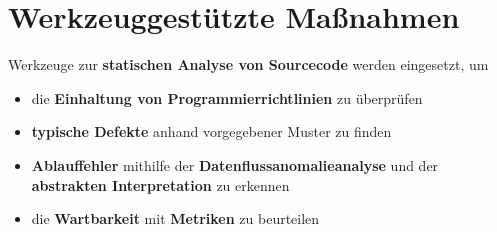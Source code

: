 \section{Werkzeuggestützte Maßnahmen}


\begin{tcolorbox}[title={Werkzeuggestützte Maßnahmen}]
\item Werkzeuge zur \textbf{statischen Analyse von Sourcecode} werden eingesetzt, um
\begin{itemize}
    \item die \textbf{Einhaltung von Programmierrichtlinien} zu überprüfen
    \item \textbf{typische Defekte} anhand vorgegebener Muster zu finden
    \item \textbf{Ablauffehler} mithilfe der \textbf{Datenflussanomalieanalyse} und der \textbf{abstrakten Interpretation} zu erkennen
    \item die \textbf{Wartbarkeit} mit \textbf{Metriken} zu beurteilen
\end{itemize}
\end{tcolorbox}
